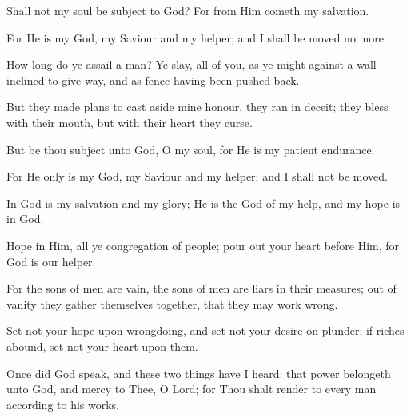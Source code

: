 Shall not my soul be subject to God? For from Him cometh my salvation.

For He is my God, my Saviour and my helper; and I shall be moved no more.

How long do ye assail a man? Ye slay, all of you, as ye might against a wall inclined to give way, and as fence having been pushed back.

But they made plans to cast aside mine honour, they ran in deceit; they bless with their mouth, but with their heart they curse.

But be thou subject unto God, O my soul, for He is my patient endurance.

For He only is my God, my Saviour and my helper; and I shall not be moved.

In God is my salvation and my glory; He is the God of my help, and my hope is in God.

Hope in Him, all ye congregation of people; pour out your heart before Him, for God is our helper.

For the sons of men are vain, the sons of men are liars in their measures; out of vanity they gather themselves together, that they may work wrong.

Set not your hope upon wrongdoing, and set not your desire on plunder; if riches abound, set not your heart upon them.

Once did God speak, and these two things have I heard: that power belongeth unto God, and mercy to Thee, O Lord; for Thou shalt render to every man according to his works.

